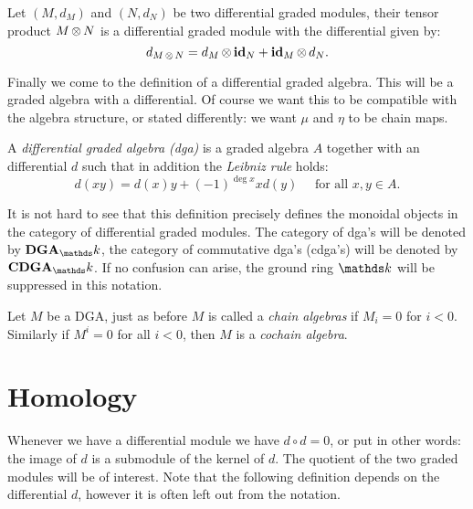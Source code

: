 \begin{definition}
	Let $(M, d_M)$ and $(N, d_N)$ be two differential graded modules, their tensor product $M \operatorname*{\otimes} N$ is a differential graded module with the differential given by:
	$$ d_{M \operatorname*{\otimes} N} = d_M \operatorname*{\otimes} \mathbf{id}_N + \mathbf{id}_M \operatorname*{\otimes} d_N. $$
\end{definition}

Finally we come to the definition of a differential graded algebra. This will be a graded algebra with a differential. Of course we want this to be compatible with the algebra structure, or stated differently: we want $\mu$ and $\eta$ to be chain maps.

\begin{definition}
	A \emph{differential graded algebra (dga)} is a graded algebra $A$ together with an differential $d$ such that in addition the \emph{Leibniz rule} holds:
	$$ d(x y) = d(x) y + (-1)^{\deg{x}} x d(y) \quad\text{ for all } x, y \in A. $$
\end{definition}


It is not hard to see that this definition precisely defines the monoidal objects in the category of differential graded modules. The category of dga's will be denoted by $\DGA_\k$, the category of commutative dga's (cdga's) will be denoted by $\CDGA_\k$. If no confusion can arise, the ground ring $\k$ will be suppressed in this notation.

Let $M$ be a DGA, just as before $M$ is called a \emph{chain algebras} if $M_i = 0$ for $i < 0$. Similarly if $M^i = 0$ for all $i < 0$, then $M$ is a \emph{cochain algebra}.





\section{Homology}

Whenever we have a differential module we have $d \circ d = 0$, or put in other words: the image of $d$ is a submodule of the kernel of $d$. The quotient of the two graded modules will be of interest. Note that the following definition depends on the differential $d$, however it is often left out from the notation.

